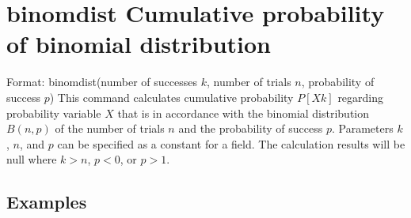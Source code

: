 
%
\section{binomdist Cumulative probability of binomial distribution\label{sect:binomdist}}
Format: binomdist(number of successes $k$, number of trials $n$, probability of success $p$)
This command calculates cumulative probability $P[X  k]$ regarding probability variable $X$ that is in accordance with the binomial distribution $B(n,p)$ of the number of trials $n$ and the probability of success $p$. Parameters $k$, $n$, and $p$ can be specified as a constant for a field. The calculation results will be null where $k > n$, $p < 0$, or $p > 1$.

\subsection*{Examples}


%
